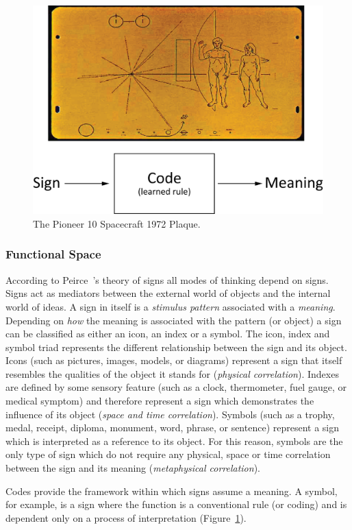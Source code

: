 \begin{figure}[!h]
 \centering
 \includegraphics[width=.45\textwidth]{images/related-work-glyphs/SignCode.png}
 \caption{The Pioneer 10 Spacecraft 1972 Plaque.}\label{fig:plaque}
\end{figure}
\subsubsection{Functional Space}
According to Peirce~\cite{Peirce1902}'s theory of signs all modes of thinking depend on signs. Signs act as mediators between the external world of objects and the internal world of ideas.  
A sign in itself is a \emph{stimulus pattern} associated with a \emph{meaning}. Depending on \emph{how} the meaning is associated 
with the pattern (or object) a sign can be classified as either an icon, an index or a symbol. 
The icon, index and symbol triad represents the different relationship between the sign and its object.
Icons (such as pictures, images, models, or diagrams) represent a sign that itself resembles the qualities of the object it stands for (\emph{physical correlation}). Indexes are defined by some sensory feature (such as a clock, thermometer, fuel gauge, or medical symptom) and therefore represent a sign which demonstrates the influence of its object (\emph{space and time correlation}). Symbols (such as a trophy, medal, receipt, diploma, monument, word, phrase, or sentence) represent a sign which is interpreted as a reference to its object. For this reason, symbols are the only type of sign which do not require any physical, space or time correlation between the sign and its meaning (\emph{metaphysical correlation}).  

Codes provide the framework within which signs assume a meaning. A symbol, for example, is a sign where the function is a conventional rule (or coding) and is dependent only on a process of interpretation (Figure~\ref{fig:plaque}).


